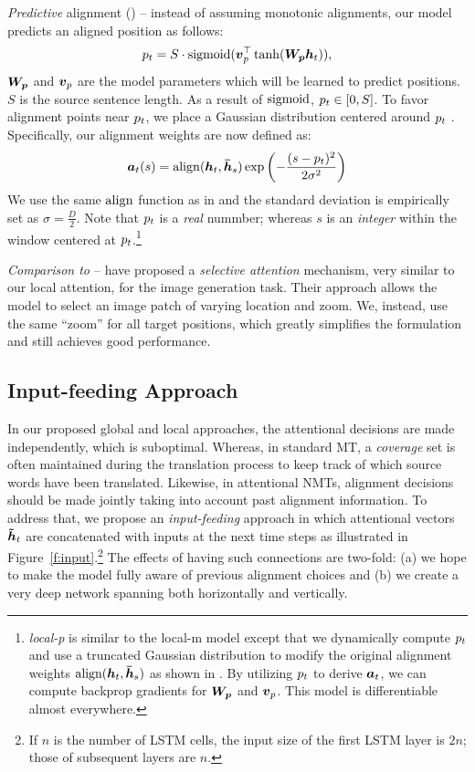 \textit{Predictive} alignment ({\bf \localp{}}) --  %
instead of assuming monotonic alignments, our model predicts an aligned position as follows:
\begin{equation}
p_{t} = S \cdot \operatorname{sigmoid}(\mbox{\boldmath{$v$}}_p^\top\tanh(\mbox{\boldmath{$W_{p}$}}\mbox{\boldmath{$h$}}_{t})),
\label{e:p}
\end{equation}
$\mbox{\boldmath{$W_{p}$}}$ and $\mbox{\boldmath{$v$}}_p$ are the model parameters which will be learned
to predict positions. $S$ is the source sentence length. As a result of $\operatorname{sigmoid}$, $p_{t}
\in [0, S]$. To favor alignment points near $p_{t}$, we place a Gaussian distribution centered around $p_{t}$ . Specifically, our alignment weights are now
defined as:
\begin{equation}
\mbox{\boldmath{$a$}}_{t}(s) = \operatorname{align}(\mbox{\boldmath{$h$}}_{t}, \mbox{\boldmath{$\bar{h}$}}_{s}) \exp \left(-\frac{(s-p_{t})^2}{2\sigma^2}\right) 
\label{e:align_p}
\end{equation}
We use the same $\operatorname{align}$ function as in
 and the standard deviation is empirically set as
$\sigma\!=\!\frac{D}{2}$. Note that $p_{t}$ is a {\it real} nummber; whereas $s$
is an {\it integer} within the window centered at $p_{t}$.\footnote{{\it local-p} is similar to the
local-m model except that we dynamically
compute $p_{t}$ and use a truncated Gaussian distribution to modify the original alignment
weights $\operatorname{align}(\mbox{\boldmath{$h$}}_{t}, \mbox{\boldmath{$\bar{h}$}}_{s})$ as shown in . By utilizing $p_{t}$
to derive $\mbox{\boldmath{$a$}}_{t}$, we can compute backprop gradients for $\mbox{\boldmath{$W_{p}$}}$ and $\mbox{\boldmath{$v$}}_p$.
This model is differentiable almost everywhere.} 

\textit{Comparison to \cite{draw15}} --
have proposed a {\it selective attention} mechanism, very
similar to our local attention, for the image generation task. Their approach 
allows the model to select an image patch of varying location and zoom. We,
instead, use the same ``zoom'' for all target positions, which greatly
simplifies the formulation and still achieves good
performance.

\subsection{Input-feeding Approach}
\label{subsec:input}
In our proposed global and local approaches, the attentional decisions are made
independently, which is suboptimal. Whereas, in standard MT, a {\it coverage}
set is often maintained during the translation process to keep track of which
source words have been translated. Likewise, in attentional NMTs, alignment
decisions should be made jointly taking into account past alignment information.
To address that, we propose an {\it input-feeding} approach in which attentional
vectors $\mbox{\boldmath{$\tilde{h}$}}_{t}$ are concatenated with inputs at the next time steps as illustrated in
Figure~\ref{f:input}.\footnote{If $n$ is the number of LSTM cells, the
input size of the first LSTM layer is $2n$; those of subsequent
layers are $n$.} The effects of having such connections are two-fold:
(a) we hope to make the model fully aware of previous alignment choices and (b)
we create a very deep network spanning both horizontally and vertically.

